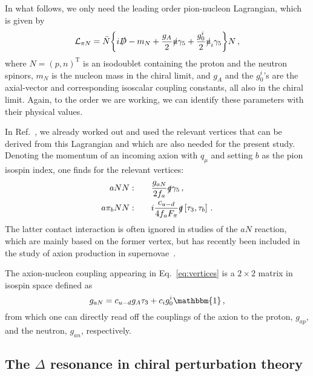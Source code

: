 \documentclass[reprint,amssymb,amsmath,floatfix,aps,prd,groupedaddress,nofootinbib]{revtex4-2}
\newcommand{\com}[2]{\left[ #1,#2 \right]}
\begin{document}
In what follows, we only need the leading order pion-nucleon Lagrangian, which is given by
\begin{equation}\label{eq:piNLagrangian}
\mathcal{L}_{\pi N} = \bar{N} \biggl\{ i \slashed{D} - m_N + \frac{g_A}{2} \slashed{u}\gamma_5 +
\frac{g_0^i}{2} \slashed{u}_i\gamma_5 \biggr\} N\, ,
\end{equation}
where $N = (p,n)^\text{T}$ is an isodoublet containing the proton and the neutron spinors, $m_N$ is the
nucleon mass in the chiral limit, and $g_A$ and the $g_0^i$'s are the axial-vector and corresponding
isoscalar coupling constants, all also in  the chiral limit. Again, to the order we are working, we can
identify these parameters with their physical values.

In Ref.~\cite{Vonk:2020zfh}, we already worked out and used the relevant vertices that can be derived
from this Lagrangian and which are also needed for the present study. Denoting the momentum of an
incoming axion with $q_\mu$ and setting $b$ as the pion isospin index, one finds for the relevant vertices:
\begin{align}
\begin{split}
aNN :& \qquad \frac{g_{aN}}{2f_a} \slashed{q} \gamma_5\,,\\
a\pi_b NN :& \qquad i\frac{c_{u-d}}{4f_a F_\pi} \slashed{q} \com{\tau_3}{\tau_b}\,.
\end{split}\label{eq:vertices}
\end{align}
The latter contact interaction is often ignored in studies of the $aN$ reaction, which are mainly based on
the former vertex, but has recently been included in the study of axion production in
supernovae~\cite{Choi:2021ign}.

The axion-nucleon coupling appearing in Eq.~\eqref{eq:vertices} is a $2\times 2$ matrix in isospin space defined as
\begin{equation}\label{eq:aNcoupling}
g_{aN} = c_{u-d} g_A \tau_3 + c_i g_0^i \mathbbm{1}\,,
\end{equation}
from which one can directly read off the couplings of the axion to the proton, $g_{ap}$, and the neutron, $g_{an}$,
respectively.

\subsection{The \texorpdfstring{$\Delta$}{Delta} resonance in chiral perturbation theory}
\end{document}
